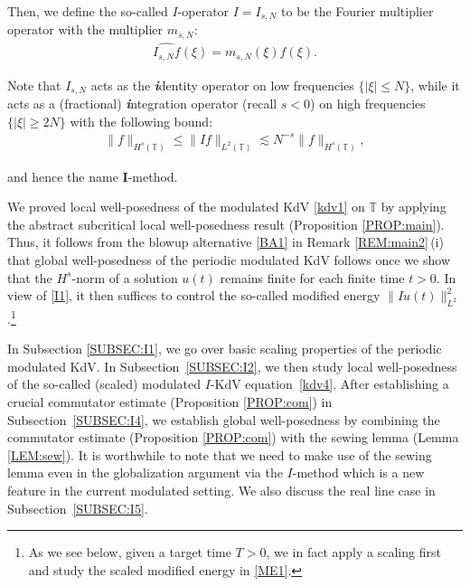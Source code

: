\documentclass[letterpaper, 11pt,  reqno]{amsart}
\newcommand{\1}{\hspace{0.5mm}\text{I}\hspace{0.5mm}}
\newcommand{\noi}{\noindent}
\newcommand{\T}{\mathbb{T}}
\newcommand{\ft}{\widehat}
\newcommand{\bi}{\bfseries\itshape}
\newcommand{\les}{\lesssim}
\numberwithin{equation}{section}
\numberwithin{theorem}{section}
\begin{document}
\noi
Then, we define the so-called $I$-operator $I = I_{s, N}$
to be the Fourier multiplier operator with the multiplier $m_{s, N}$:
\begin{align}
\ft{I_{s, N}f}(\xi)=m_{s, N}(\xi)\ft{f}(\xi).
\label{Ix2}
\end{align}


\noi
Note that 
$I_{s, N}$ acts as the {\bi i}\hspace{0.25mm}dentity operator on low frequencies $\{ |\xi| \leq N\}$, 
while it acts as a (fractional)  
{{\bi i}\hspace{0.25mm}\nolinebreak ntegration}   operator 
(recall  $s < 0$)
 on high frequencies $\{ |\xi| \geq 2N\}$
 with the following bound:
\begin{align}
\| f \|_{H^s (\T) } \leq\| I f \|_{L^2(\T)}
\les N^{-s} \| f \|_{H^s(\T)}, 
\label{I1}
\end{align}

\noi
 and hence the name $\pmb{I}$-method.



We proved local well-posedness
of 
the modulated KdV \eqref{kdv1} on $\T$
by applying the abstract subcritical  local well-posedness
result (Proposition \ref{PROP:main}).
Thus, it follows from the blowup alternative \eqref{BA1}
in Remark \ref{REM:main2}\,(i)
that 
global well-posedness of the periodic modulated KdV follows
once we show that the $H^s$-norm 
of a solution $u(t)$ remains finite 
for each finite time $t > 0$.
In view of \eqref{I1}, 
it then suffices to control the so-called
modified energy $\| Iu(t)\|_{L^2}^2$.\footnote{As we see below, given a target time $T> 0$, 
we in fact apply a scaling first and study the scaled modified energy in \eqref{ME1}.}


In Subsection \ref{SUBSEC:I1}, 
we go over basic scaling properties
of the periodic modulated KdV.
In Subsection~\ref{SUBSEC:I2}, 
we then study  local well-posedness
of the so-called (scaled) modulated $I$-KdV equation~\eqref{kdv4}.
After establishing a crucial commutator estimate
(Proposition \ref{PROP:com}) in Subsection~\ref{SUBSEC:I4}, 
we establish global well-posedness
by combining the commutator estimate (Proposition \ref{PROP:com})
with the sewing lemma (Lemma \ref{LEM:sew}).
It is worthwhile to note that we need to make use
of the sewing lemma even in the globalization argument via the $I$-method
which is a new feature in the current modulated setting.
We also discuss the real line case in Subsection~\ref{SUBSEC:I5}.
\end{document}
